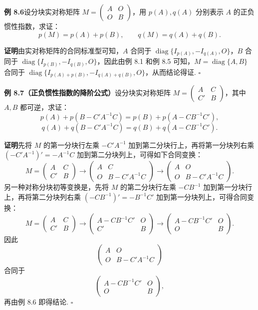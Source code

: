 \documentclass[UTF8, 12pt, fontset=fandol, oneside]{ctexart}
\begin{document}
\noindent\textbf{例 8.6}\quad 设分块实对称矩阵 $M=\left(\begin{array}{cc}A&O\\ O&B\end{array}\right)$，用 $p(A),q(A)$ 分别表示 $A$ 的正负惯性指数，求证：
\[
p(M)=p(A)+p(B),\qquad q(M)=q(A)+q(B).
\]

\noindent\textbf{证明}\quad 由实对称矩阵的合同标准型可知，$A$ 合同于 $\operatorname{diag}\{I_{p(A)},-I_{q(A)},O\}$，$B$ 合同于 $\operatorname{diag}\{I_{p(B)},-I_{q(B)},O\}$，因此由例 8.1 和例 8.5 可知，$M=\operatorname{diag}\{A,B\}$ 合同于 $\operatorname{diag}\{I_{p(A)+p(B)},-I_{q(A)+q(B)},O\}$，从而结论得证. $\ensuremath{\square}$

\noindent\textbf{例 8.7（正负惯性指数的降阶公式）}\quad 设分块实对称矩阵 $M=\left(\begin{array}{cc}A&C\\ C'&B\end{array}\right)$，其中 $A,B$ 都可逆，求证：
\[
p(A)+p(B-C'A^{-1}C)=p(B)+p(A-CB^{-1}C'),
\]
\[
q(A)+q(B-C'A^{-1}C)=q(B)+q(A-CB^{-1}C').
\]

\noindent\textbf{证明}\quad 先将 $M$ 的第一分块行左乘 $-C'A^{-1}$ 加到第二分块行上，再将第一分块列右乘 $(-C'A^{-1})'=-A^{-1}C$ 加到第二分块列上，可得如下合同变换：
\[
M=\left(\begin{array}{cc}
A & C\\
C' & B
\end{array}\right)
\to
\left(\begin{array}{cc}
A & C\\
O & B-C'A^{-1}C
\end{array}\right)
\to
\left(\begin{array}{cc}
A & O\\
O & B-C'A^{-1}C
\end{array}\right).
\]
另一种对称分块初等变换是，先将 $M$ 的第二分块行左乘 $-CB^{-1}$ 加到第一分块行上，再将第二分块列右乘 $(-CB^{-1})'=-B^{-1}C'$ 加到第一分块列上，可得合同变换：
\[
M=\left(\begin{array}{cc}
A & C\\
C' & B
\end{array}\right)
\to
\left(\begin{array}{cc}
A-CB^{-1}C' & O\\
C' & B
\end{array}\right)
\to
\left(\begin{array}{cc}
A-CB^{-1}C' & O\\
O & B
\end{array}\right).
\]
因此
\[
\left(\begin{array}{cc}
A & O\\
O & B-C'A^{-1}C
\end{array}\right)
\]
合同于
\[
\left(\begin{array}{cc}
A-CB^{-1}C' & O\\
O & B
\end{array}\right),
\]
再由例 8.6 即得结论. $\ensuremath{\square}$
\end{document}

